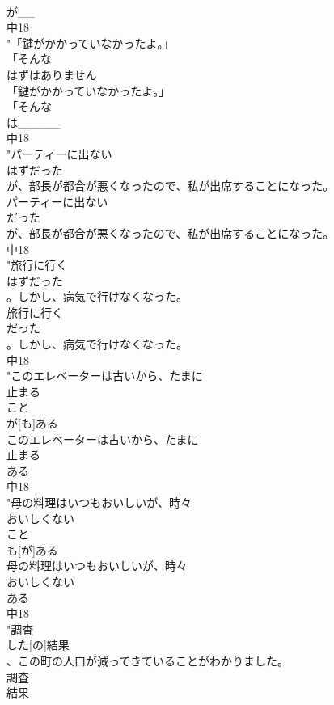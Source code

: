 \documentclass[8pt]{extreport}
\begin{document}
\begin{CJK}{UTF8}{min}
\\	が__
\\	中18
\\	"「鍵がかかっていなかったよ。」
\\	「そんな
\\	はずはありません
\\	「鍵がかかっていなかったよ。」
\\	「そんな
\\	は_____
\\	中18
\\	"パーティーに出ない
\\	はずだった
\\	が、部長が都合が悪くなったので、私が出席することになった。
\\	パーティーに出ない
\\	だった
\\	が、部長が都合が悪くなったので、私が出席することになった。
\\	中18
\\	"旅行に行く
\\	はずだった
\\	。しかし、病気で行けなくなった。
\\	旅行に行く
\\	だった
\\	。しかし、病気で行けなくなった。
\\	中18
\\	"このエレベーターは古いから、たまに
\\	止まる
\\	こと
\\	が[も]ある
\\	このエレベーターは古いから、たまに
\\	止まる
\\	ある
\\	中18
\\	"母の料理はいつもおいしいが、時々
\\	おいしくない
\\	こと
\\	も[が]ある
\\	母の料理はいつもおいしいが、時々
\\	おいしくない
\\	ある
\\	中18
\\	"調査
\\	した[の]結果
\\	、この町の人口が減ってきていることがわかりました。
\\	調査
\\	結果

\end{CJK}
\end{document}
